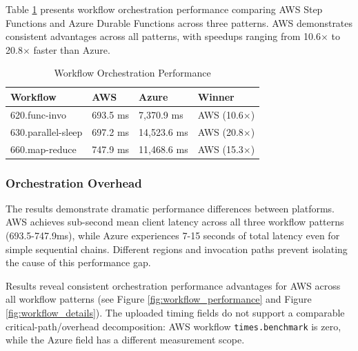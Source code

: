 \documentclass[sigconf,nonacm]{acmart}
\begin{document}
Table \ref{tab:workflow_results} presents workflow orchestration performance comparing AWS Step Functions and Azure Durable Functions across three patterns. AWS demonstrates consistent advantages across all patterns, with speedups ranging from 10.6$\times$ to 20.8$\times$ faster than Azure.

\begin{table}[ht]
\centering
\caption{Workflow Orchestration Performance}
\label{tab:workflow_results}
\begin{tabular}{@{}llll@{}}
\toprule
\textbf{Workflow} & \textbf{AWS} & \textbf{Azure} & \textbf{Winner} \\ \midrule
620.func-invo & 693.5 ms & 7,370.9 ms & AWS (10.6$\times$) \\
630.parallel-sleep & 697.2 ms & 14,523.6 ms & AWS (20.8$\times$) \\
660.map-reduce & 747.9 ms & 11,468.6 ms & AWS (15.3$\times$) \\ \bottomrule
\end{tabular}
\end{table}

\subsubsection{Orchestration Overhead}

The results demonstrate dramatic performance differences between platforms. AWS achieves sub-second mean client latency across all three workflow patterns (693.5-747.9ms), while Azure experiences 7-15 seconds of total latency even for simple sequential chains. Different regions and invocation paths prevent isolating the cause of this performance gap.

Results reveal consistent orchestration performance advantages for AWS across all workflow patterns (see Figure \ref{fig:workflow_performance} and Figure \ref{fig:workflow_details}). The uploaded timing fields do not support a comparable critical-path/overhead decomposition: AWS workflow \texttt{times.benchmark} is zero, while the Azure field has a different measurement scope.
\end{document}
